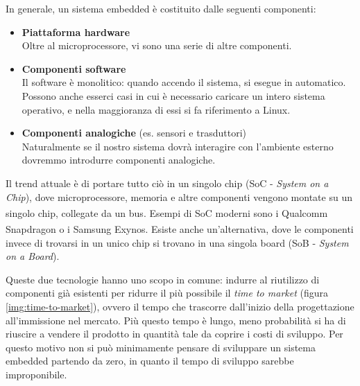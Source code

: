 \documentclass[10pt,a4paper,oneside]{scrbook}
\begin{document}
\smallskip
In generale, un sistema embedded è costituito dalle seguenti componenti:
\begin{itemize}
	\item \textbf{Piattaforma hardware}\\
    Oltre al microprocessore, vi sono una serie di altre componenti.
	\item \textbf{Componenti software}\\
    Il software è monolitico: quando accendo il sistema, si esegue in automatico.
    Possono anche esserci casi in cui è necessario caricare un intero sistema operativo, e nella maggioranza di essi si fa riferimento a Linux.
	\item \textbf{Componenti analogiche} (es. sensori e trasduttori)\\
    Naturalmente se il nostro sistema dovrà interagire con l'ambiente esterno dovremmo introdurre componenti analogiche.
\end{itemize}
Il trend attuale è di portare tutto ciò in un singolo chip (SoC - \textit{System on a Chip}), dove microprocessore,
memoria e altre componenti vengono montate su un singolo chip, collegate da un bus. Esempi di SoC moderni sono i
Qualcomm\textsuperscript{\tiny\textregistered} Snapdragon o i Samsung\textsuperscript{\tiny\textregistered} Exynos.
Esiste anche un'alternativa, dove le componenti invece di trovarsi in un unico chip si trovano in una singola
board (SoB - \textit{System on a Board}).

Queste due tecnologie hanno uno scopo in comune: indurre al riutilizzo di componenti già esistenti per
ridurre il più possibile il \textit{time to market} (figura \ref{img:time-to-market}), ovvero il tempo che trascorre
dall'inizio della progettazione all'immissione nel mercato. Più questo tempo è lungo, meno probabilità si ha di riuscire a vendere
il prodotto in quantità tale da coprire i costi di sviluppo.
Per questo motivo non si può minimamente pensare di sviluppare un sistema embedded partendo da zero, in quanto il tempo di sviluppo
sarebbe improponibile.
\end{document}
